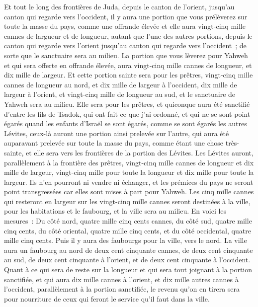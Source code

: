 \begin{multicols}{2}
Et tout le long des frontières de Juda, depuis le canton de l'orient, jusqu'au canton qui regarde vers l'occident, il y aura une portion que vous prélèverez sur toute la masse du pays, comme une offrande élevée et elle aura vingt-cinq mille cannes de largueur et de longueur, autant que l'une des autres portions, depuis le canton qui regarde vers l'orient jusqu'au canton qui regarde vers l'occident~; de sorte que le sanctuaire sera au milieu.
La portion que vous lèverez pour Yahweh et qui sera offerte en offrande élevée, aura vingt-cinq mille cannes de longueur, et dix mille de largeur.
Et cette portion sainte sera pour les prêtres, vingt-cinq mille cannes de longueur au nord, et dix mille de largeur à l'occident, dix mille de largeur à l'orient, et vingt-cinq mille de longueur au sud, et le sanctuaire de Yahweh sera au milieu.
Elle sera pour les prêtres, et quiconque aura été sanctifié d'entre les fils de Tsadok, qui ont fait ce que j'ai ordonné, et qui ne se sont point égarés quand les enfants d'Israël se sont égarés, comme se sont égarés les autres Lévites,
ceux-là auront une portion ainsi prelevée sur l'autre, qui aura été auparavant prelevée sur toute la masse du pays, comme étant une chose très-sainte, et elle sera vers les frontières de la portion des Lévites.
Les Lévites auront, parallèlement à la frontière des prêtres, vingt-cinq mille cannes de longueur et dix mille de largeur, vingt-cinq mille pour toute la longueur et dix mille pour toute la largeur.
Ils n'en pourront ni vendre ni échanger, et les prémices du pays ne seront point transgressées car elles sont mises à part pour Yahweh.
Les cinq mille cannes qui resteront en largeur sur les vingt-cinq mille cannes seront destinées à la ville, pour les habitations et le faubourg, et la ville sera au milieu.
En voici les mesures~: Du côté nord, quatre mille cinq cents cannes, du côté sud, quatre mille cinq cents, du côté oriental, quatre mille cinq cents, et du côté occidental, quatre mille cinq cents.
Puis il y aura des faubourgs pour la ville, vers le nord. La ville aura un faubourg au nord de deux cent cinquante cannes, de deux cent cinquante au sud, de deux cent cinquante à l'orient, et de deux cent cinquante à l'occident.
Quant à ce qui sera de reste sur la longueur et qui sera tout joignant à la portion sanctifiée, et qui aura dix mille cannes à l'orient, et dix mille autres cannes à l'occident, parallèlement à la portion sanctifiée, le revenu qu'on en tirera sera pour nourriture de ceux qui feront le service qu'il faut dans la ville.

\end{multicols}
